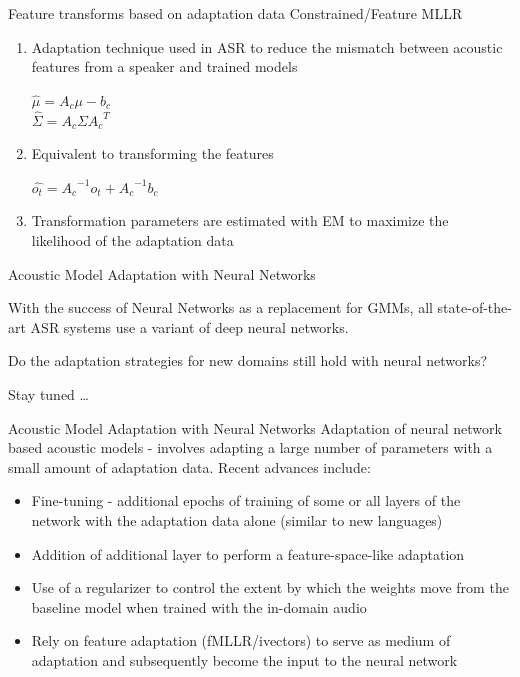 \begin{frame}{Feature transforms based on adaptation data}
\alert{Constrained/Feature MLLR}
        \begin{enumerate}
        \item Adaptation technique used in ASR to reduce the mismatch between acoustic
        features from a speaker and trained models \\
        \begin{center}
                $\hat{\mu} = A_c\mu - b_c$\\
                $\hat{\Sigma} = A_c \Sigma {A_c}^T$
        \end{center}
        \item Equivalent to transforming the features \\
        \begin{center}
                $\hat{o_t} = {A_c}^{-1}o_t + {A_c}^{-1}b_c$
        \end{center}
        \item Transformation parameters are estimated with EM to maximize the
        likelihood of the adaptation data
        \end{enumerate}
\end{frame}


\begin{frame} {Acoustic Model Adaptation with Neural Networks}

With the success of Neural Networks as a replacement for GMMs, all state-of-the-art ASR systems use a variant of deep neural networks.

Do the adaptation strategies for new domains still hold with neural networks? \pause

Stay tuned \ldots

\end{frame}

\begin{frame} {Acoustic Model Adaptation with Neural Networks}
\alert{Adaptation of neural network based acoustic models} - involves adapting a large number of parameters with a small amount of adaptation data. Recent advances include:
        \begin{itemize}
        \item \alert{Fine-tuning} - additional epochs of training of some or all layers of the network with the adaptation data alone (similar to new languages)~\cite{abdel2013fast, sainath2015deep}
        \item \alert{Addition of additional layer} to perform a feature-space-like adaptation~\cite{abdel2013fast}
        \item Use of a \alert{regularizer} to control the extent by which the weights move from the baseline model when trained with the in-domain audio~\cite{hsiao2015unsupervised}
        \item Rely on \alert{feature adaptation} (fMLLR/ivectors) to serve as medium of adaptation and subsequently become the input to the neural network~\cite{sainath2013improvements, saon2013speaker}
        \end{itemize}
\end{frame}

